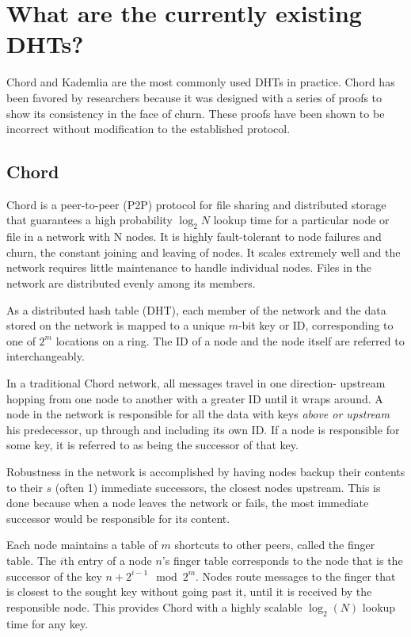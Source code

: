 \section{What are the currently existing DHTs?}

Chord and Kademlia are the most commonly used DHTs in practice. 
Chord has been favored by researchers because it was designed with a series of proofs to show its consistency in the face of churn.
These proofs have been shown to be incorrect\cite{zave2012using} without modification to the established protocol.


\subsection{Chord}
Chord\cite{chord} is a peer-to-peer (P2P) protocol for file sharing and distributed storage that guarantees a high probability $\log_{2} N$  lookup time for a particular node or file in a network with N nodes. 
It is highly fault-tolerant to node failures and churn, the constant joining and leaving of nodes.  It scales extremely well and the network requires little maintenance to handle individual nodes.  
Files in the network are distributed evenly among its members.

As a distributed hash table (DHT), each member of the network and the data stored on the network is mapped to a unique $m$-bit key or ID, corresponding to one of  $2^m$ locations on a ring. 
The ID of a node and the node itself are referred to interchangeably.

In a traditional Chord network, all messages travel in one direction- upstream hopping from one node to another with a greater ID until it wraps around.
A node in the network is responsible for all the data with keys \textit{above or upstream} his predecessor, up through and including its own ID.  If a node is responsible for some key, it is referred to as being the successor of that key.

Robustness in the network is accomplished by having nodes backup their contents to their $s$ (often 1) immediate successors, the closest nodes upstream.  
This is done because when a node leaves the network or fails, the most immediate successor would be responsible for its content.

Each node maintains a table of $m$ shortcuts to other peers, called the finger table.   The $i$th entry of a node $n$'s finger table corresponds to the node that is the successor of the key $n+2^{i-1} \mod 2^m $.  
Nodes route messages to the finger that is closest to the sought key without going past it, until it is received by the responsible node.  This provides Chord with a highly scalable $\log_2(N)$ lookup time for any key\cite{chord}.

